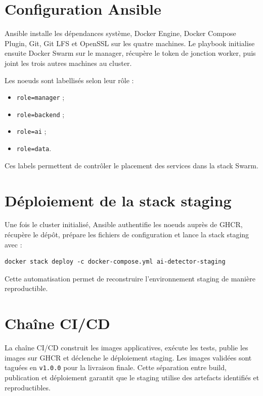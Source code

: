 ﻿\documentclass[12pt, a4paper]{report}
\begin{document}
\section{Configuration Ansible}

Ansible installe les dépendances système, Docker Engine, Docker Compose Plugin,
Git, Git LFS et OpenSSL sur les quatre machines. Le playbook initialise ensuite
Docker Swarm sur le manager, récupère le token de jonction worker, puis joint les
trois autres machines au cluster.

Les noeuds sont labellisés selon leur rôle :

\begin{itemize}
  \item \texttt{role=manager} ;
  \item \texttt{role=backend} ;
  \item \texttt{role=ai} ;
  \item \texttt{role=data}.
\end{itemize}

Ces labels permettent de contrôler le placement des services dans la stack
Swarm.

\section{Déploiement de la stack staging}

Une fois le cluster initialisé, Ansible authentifie les noeuds auprès de GHCR,
récupère le dépôt, prépare les fichiers de configuration et lance la stack
staging avec :

\begin{verbatim}
docker stack deploy -c docker-compose.yml ai-detector-staging
\end{verbatim}

Cette automatisation permet de reconstruire l'environnement staging de manière
reproductible.

\section{Chaîne CI/CD}

La chaîne CI/CD construit les images applicatives, exécute les tests, publie les
images sur GHCR et déclenche le déploiement staging. Les images validées sont
taguées en \texttt{v1.0.0} pour la livraison finale. Cette séparation entre build,
publication et déploiement garantit que le staging utilise des artefacts
identifiés et reproductibles.
\end{document}
